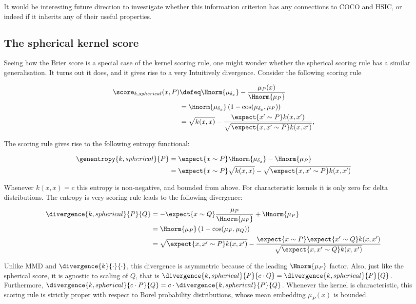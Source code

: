 It would be interesting future direction to investigate whether this information criterion has any connections to COCO and HSIC, or indeed if it inherits any of their useful properties.

\subsection{The spherical kernel score\label{sec:spherical_kernel_score}}

Seeing how the Brier score is a special case of the kernel scoring rule, one might wonder whether the spherical scoring rule has a similar generalisation. It turns out it does, and it gives rise to a very Intuitively divergence. Consider the following scoring rule

\begin{align}
	\score_{k,spherical}(x,P) &\defeq \Hnorm{\mu_{\delta_x}} - \frac{\mu_P(x)}{\Hnorm{\mu_P}}\\
			& = \Hnorm{\mu_{\delta_x}}\left(1 - \cos(\mu_{\delta_x},\mu_{P})\right)\\
		& =\sqrt{k(x,x)} - \frac{\expect{x'\sim P}k(x,x')}{\sqrt{\expect{x,x'\sim P}k(x,x')}},
\end{align}

The scoring rule gives rise to the following entropy functional:

\begin{align}
	\genentropy{k,spherical}{P} & = \expect{x\sim P}\Hnorm{\mu_{\delta_x}} - \Hnorm{\mu_P}\\
		& = \expect{x\sim P}\sqrt{k(x,x)} - \sqrt{\expect{x,x'\sim P}k(x,x')}
\end{align}

Whenever $k(x,x)=c$ this entropy is non-negative, and bounded from above. For characteristic kernels it is only zero for delta distributions. The entropy is very scoring rule leads to the following divergence:

\begin{align}
	\divergence{k,spherical}{P}{Q} &= - \expect{x\sim Q}\frac{\mu_P}{\Hnorm{\mu_P}} + \Hnorm{\mu_P}\\
		&= \Hnorm{\mu_P} \left( 1 - \cos(\mu_P, \mu_Q)\right)\\
		&= \sqrt{\expect{x,x'\sim P}k(x,x')} - \frac{\expect{x\sim P}\expect{x'\sim Q}k(x,x')}{\sqrt{\expect{x,x'\sim Q}k(x,x')}} \label{eqn:spherical_kernel_divergence}
\end{align}

Unlike MMD and $\divergence{k}{\cdot}{\cdot}$, this divergence is asymmetric because of the leading $\Hnorm{\mu_P}$ factor. Also, just like the spherical score, it is agnostic to scaling of $Q$, that is $\divergence{k,spherical}{P}{c\cdot Q} = \divergence{k,spherical}{P}{Q}$. Furthermore, $\divergence{k,spherical}{c\cdot P}{Q} = c \cdot \divergence{k,spherical}{P}{Q}$. Whenever the kernel is characteristic, this scoring rule is strictly proper with respect to Borel probability distributions, whose mean embedding $\mu_P(x)$ is bounded.


